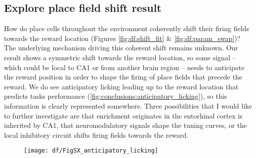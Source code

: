 \subsection{Explore place field shift result}
How do place cells throughout the environment coherently shift their firing fields towards the reward location (Figures \ref{fig:df:shift_fit} \& \ref{fig:df:param_swap})?
The underlying mechanism driving this coherent shift remains unknown.
Our result shows a symmetric shift towards the reward location, so some signal -- which could be local to CA1 or from another brain region -- needs to anticipate the reward position in order to shape the firing of place fields that precede the reward.
We do see anticipatory licking leading up to the reward location that predicts tasks performance (\autoref{fig:conclusions:anticipatory_licking}), so this information is clearly represented somewhere.
Three possibilities that I would like to further investigate are that enrichment originates in the entorhinal cortex is inherited by CA1, that neuromodulatory signals shape the tuning curves, or the local inhibitory circuit shifts firing fields towards the reward.
\begin{figure}
	\centering
	\texttt{[image: df/FigSX\_anticipatory\_licking]}
	\caption{}
	\label{fig:conclusions:anticipatory_licking}
\end{figure}

